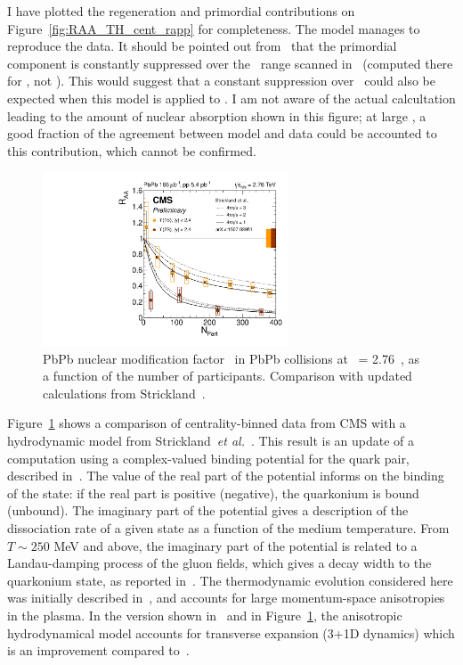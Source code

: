  I have plotted the regeneration and primordial contributions on
Figure~\ref{fig:RAA_TH_cent_rapp} for completeness. The model manages
to reproduce the data. It should be pointed out
from~\cite{Zhao:2011cv} that the primordial component is constantly suppressed over the \pt\ range scanned
in~\cite{Zhao:2011cv} (computed there
for \Jpsi, not \PgU). This would suggest that a constant suppression
over \pt\ could also be expected when this model is applied to \PgU. I
am not aware of the actual calcultation leading to the amount of
nuclear absorption shown in this figure; at large \Npart, a good
fraction of the agreement between model and data could be accounted to
this contribution, which cannot be confirmed.
\begin{figure}[h]
  \begin{centering}  
\includegraphics[width=0.65\textwidth]{Chapters/aUpsilon/RAA_NPART_Strickland.pdf}
    \caption{PbPb nuclear modification factor \RAA\ in PbPb collisions
      at \snn\ = 2.76~\TeV, as a function of the number of participants. Comparison with updated calculations from Strickland~\cite{Krouppa:2015yoa}.}
    \label{fig:RAA_TH_cent_strickland}
  \end{centering}  
\end{figure}

Figure~\ref{fig:RAA_TH_cent_strickland} shows a comparison of
centrality-binned data from CMS with a hydrodynamic model from
Strickland~\textit{et al.}~\cite{Krouppa:2015yoa}. This result is an
update of a computation using a complex-valued binding potential
for the quark pair, described in~\cite{Strickland:2012cq}. The value
of the real
part of the potential informs on the binding of the state: if
the real part is positive (negative), the quarkonium is bound
(unbound). The imaginary part of the potential gives a description of
the dissociation rate of a given state as a function of the medium
temperature. From $T\sim 250$ MeV and above, the imaginary part of the
potential is related to a Landau-damping process of the gluon fields,
which gives a decay width to the quarkonium state, as reported
in~\cite{Laine:2006ns}. The thermodynamic evolution considered here was
initially described in~\cite{Strickland:2011aa}, and accounts for large
momentum-space anisotropies in the plasma. In the version shown
in~\cite{Krouppa:2015yoa} and in Figure~\ref{fig:RAA_TH_cent_strickland},
the anisotropic hydrodynamical model accounts for transverse expansion
(3+1D dynamics) which is an improvement compared
to~\cite{Strickland:2012cq}.




